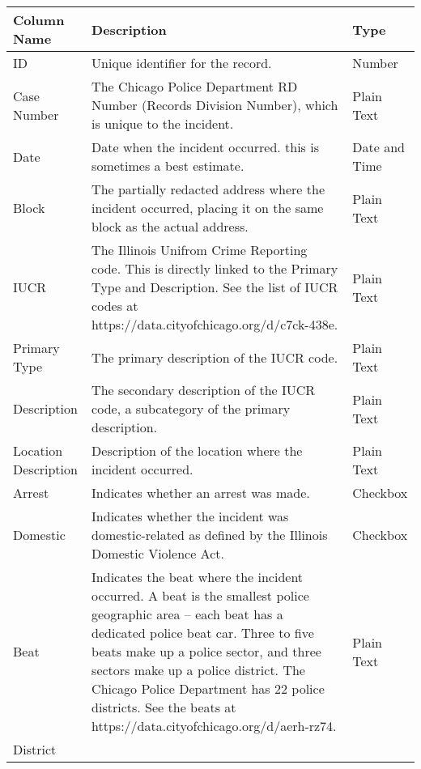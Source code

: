 \begin{longtable}{|m{6em}|m{18em}|m{7em}|}
    \hline
        Column Name & 
        Description & 
        Type\\
    \hline
        ID & 
        Unique identifier for the record. & 
        Number\\
    \hline
        Case Number & 
        The Chicago Police Department RD Number (Records Division Number),
        which is unique to the incident. & 
        Plain Text\\
    \hline
        Date & 
        Date when the incident occurred. this is sometimes a best estimate. & 
        Date and Time\\
    \hline
        Block & 
        The partially redacted address where the incident occurred, 
        placing it on the same block as the actual address. & 
        Plain Text\\
    \hline
        IUCR & 
        The Illinois Unifrom Crime Reporting code. This is directly linked 
        to the Primary Type and Description. See the list of IUCR codes 
        at https://data.cityofchicago.org/d/c7ck-438e. & 
        Plain Text\\
    \hline
        Primary Type & 
        The primary description of the IUCR code. & 
        Plain Text\\
    \hline
        Description & 
        The secondary description of the IUCR code, 
        a subcategory of the primary description. & 
        Plain Text\\
    \hline
        Location Description & 
        Description of the location where the incident occurred. & 
        Plain Text\\
    \hline
        Arrest & 
        Indicates whether an arrest was made. & 
        Checkbox\\
    \hline
        Domestic & 
        Indicates whether the incident was domestic-related as 
        defined by the Illinois Domestic Violence Act. & 
        Checkbox\\
    \hline
        Beat & 
        Indicates the beat where the incident occurred. A beat is the 
        smallest police geographic area – each beat has a dedicated 
        police beat car. Three to five beats make up a police sector, 
        and three sectors make up a police district. The Chicago Police 
        Department has 22 police districts. See the beats 
        at https://data.cityofchicago.org/d/aerh-rz74. & 
        Plain Text\\
    \hline
        District & 

\end{longtable}
